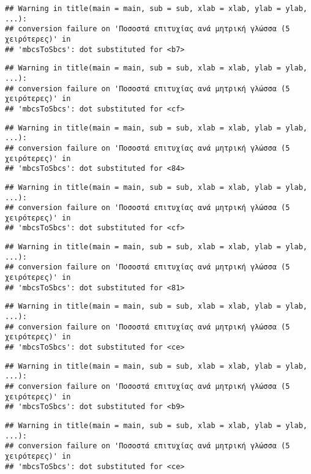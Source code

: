 \documentclass[
]{article}
\begin{document}
\begin{verbatim}
## Warning in title(main = main, sub = sub, xlab = xlab, ylab = ylab, ...):
## conversion failure on 'Ποσοστά επιτυχίας ανά μητρική γλώσσα (5 χειρότερες)' in
## 'mbcsToSbcs': dot substituted for <b7>
\end{verbatim}

\begin{verbatim}
## Warning in title(main = main, sub = sub, xlab = xlab, ylab = ylab, ...):
## conversion failure on 'Ποσοστά επιτυχίας ανά μητρική γλώσσα (5 χειρότερες)' in
## 'mbcsToSbcs': dot substituted for <cf>
\end{verbatim}

\begin{verbatim}
## Warning in title(main = main, sub = sub, xlab = xlab, ylab = ylab, ...):
## conversion failure on 'Ποσοστά επιτυχίας ανά μητρική γλώσσα (5 χειρότερες)' in
## 'mbcsToSbcs': dot substituted for <84>
\end{verbatim}

\begin{verbatim}
## Warning in title(main = main, sub = sub, xlab = xlab, ylab = ylab, ...):
## conversion failure on 'Ποσοστά επιτυχίας ανά μητρική γλώσσα (5 χειρότερες)' in
## 'mbcsToSbcs': dot substituted for <cf>
\end{verbatim}

\begin{verbatim}
## Warning in title(main = main, sub = sub, xlab = xlab, ylab = ylab, ...):
## conversion failure on 'Ποσοστά επιτυχίας ανά μητρική γλώσσα (5 χειρότερες)' in
## 'mbcsToSbcs': dot substituted for <81>
\end{verbatim}

\begin{verbatim}
## Warning in title(main = main, sub = sub, xlab = xlab, ylab = ylab, ...):
## conversion failure on 'Ποσοστά επιτυχίας ανά μητρική γλώσσα (5 χειρότερες)' in
## 'mbcsToSbcs': dot substituted for <ce>
\end{verbatim}

\begin{verbatim}
## Warning in title(main = main, sub = sub, xlab = xlab, ylab = ylab, ...):
## conversion failure on 'Ποσοστά επιτυχίας ανά μητρική γλώσσα (5 χειρότερες)' in
## 'mbcsToSbcs': dot substituted for <b9>
\end{verbatim}

\begin{verbatim}
## Warning in title(main = main, sub = sub, xlab = xlab, ylab = ylab, ...):
## conversion failure on 'Ποσοστά επιτυχίας ανά μητρική γλώσσα (5 χειρότερες)' in
## 'mbcsToSbcs': dot substituted for <ce>
\end{verbatim}
\end{document}
